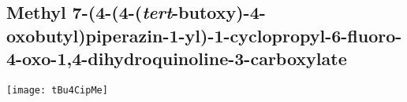 %
%
%

\subsection{Methyl 7\hyp{}(4\hyp{}(4\hyp{}(\textit{tert}\hyp{}butoxy)\hyp{}4\hyp{}oxobutyl)piperazin\hyp{}1\hyp{}yl)\hyp{}1\hyp{}cyclopropyl\hyp{}6\hyp{}fluoro\hyp{}4\hyp{}oxo\hyp{}1,4\hyp{}dihydroquinoline\hyp{}3\hyp{}carboxylate }


\begin{scheme}[H]
	\begin{center}
		\texttt{[image: tBu4CipMe]}
	\end{center}
\end{scheme}

